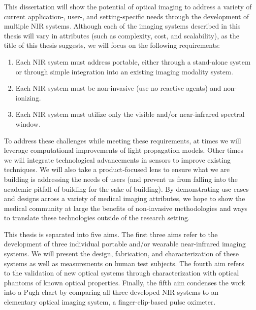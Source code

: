 This dissertation will show the potential of optical imaging to address a variety of current application-, user-, and setting-specific needs through the development of multiple \ac{NIR} systems. Although each of the imaging systems described in this thesis will vary in attributes (such as complexity, cost, and scalability), as the title of this thesis suggests, we will focus on the following requirements:
\begin{enumerate}
  \item Each NIR system must address portable, either through a stand-alone system or through simple integration into an existing imaging modality system. 
  \item Each NIR system must be non-invasive (use no reactive agents) and non-ionizing.
  \item Each NIR system must utilize only the visible and/or near-infrared spectral window.
\end{enumerate}

To address these challenges while meeting these requirements, at times we will leverage computational improvements of light propagation models. Other times we will integrate technological advancements in sensors to improve existing techniques. We will also take a product-focused lens to ensure what we are building is addressing the needs of users (and prevent us from falling into the academic pitfall of building for the sake of building). By demonstrating use cases and designs across a variety of medical imaging attributes, we hope to show the medical community at large the benefits of non-invasive methodologies and ways to translate these technologies outside of the research setting. 

This thesis is separated into five aims. The first three aims refer to the development of three individual portable and/or wearable near-infrared imaging systems. We will present the design, fabrication, and characterization of these systems as well as measurements on human test subjects. The fourth aim refers to the validation of new optical systems through characterization with optical phantoms of known optical properties. Finally, the fifth aim condenses the work into a Pugh chart by comparing all three developed NIR systems to an elementary optical imaging system, a finger-clip-based pulse oximeter. 

